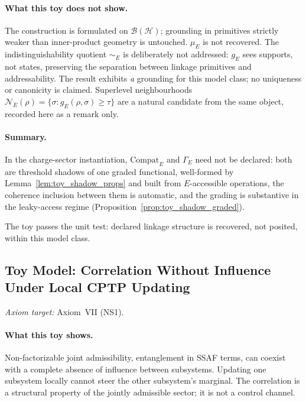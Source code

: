 \documentclass[aps,prx,onecolumn,11pt]{revtex4-2}
\theoremstyle{plain}
\theoremstyle{definition}
\theoremstyle{remark}
\begin{document}
\paragraph{What this toy does not show.}
The construction is formulated on \(\mathcal B(\mathcal H)\); grounding
in primitives strictly weaker than inner-product geometry is untouched.
\(\mu_E\) is not recovered. The indistinguishability quotient
\(\sim_E\) is deliberately not addressed: \(g_E\) sees supports, not
states, preserving the separation between linkage primitives and
addressability. The result exhibits \emph{a} grounding for this model
class; no uniqueness or canonicity is claimed. Superlevel
neighbourhoods
\(\mathcal N_E(\rho)=\{\sigma: g_E(\rho,\sigma)\ge\tau\}\) are a natural
candidate from the same object, recorded here as a remark only.

\paragraph{Summary.}
In the charge-sector instantiation, \(\mathrm{Compat}_E\) and
\(\Gamma_E\) need not be declared: both are threshold shadows of one
graded functional, well-formed by Lemma~\ref{lem:toy_shadow_props} and
built from \(E\)-accessible operations, the coherence inclusion
between them is automatic, and the grading is substantive in the
leaky-access regime (Proposition~\ref{prop:toy_shadow_graded}).

The toy passes the unit test: declared linkage structure is recovered,
not posited, within this model class.

\subsection{Toy Model: Correlation Without Influence Under Local CPTP Updating}
\label{toy:correlation_without_influence}

\noindent\emph{Axiom target:} Axiom~VII (NS1).

\paragraph{What this toy shows.}

Non-factorizable joint admissibility, entanglement in SSAF terms, can
coexist with a complete absence of influence between subsystems.
Updating one subsystem locally cannot steer the other subsystem's
marginal. The correlation is a structural property of the jointly
admissible sector; it is not a control channel.
\end{document}
